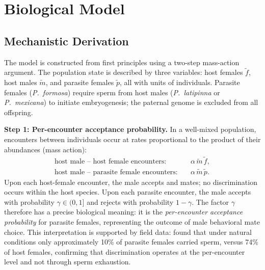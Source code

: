 \documentclass[12pt]{article}
\begin{document}
\section{Biological Model}

\subsection{Mechanistic Derivation}

The model is constructed from first principles using a two-step
mass-action argument. The population state is described by three
variables: host females $\tilde{f}$, host males $\tilde{m}$, and parasite
females $\tilde{p}$, all with units of individuals. Parasite females
(\textit{P.~formosa}) require sperm from host males (\textit{P.~latipinna}
or \textit{P.~mexicana}) to initiate embryogenesis; the paternal genome
is excluded from all offspring.

\noindent\textbf{Step 1: Per-encounter acceptance probability.}
In a well-mixed population, encounters between individuals occur at
rates proportional to the product of their abundances (mass action):
\begin{align*}
  \text{host male -- host female encounters:}   &\quad \alpha\,\tilde{m}\,\tilde{f}, \\
  \text{host male -- parasite female encounters:} &\quad \alpha\,\tilde{m}\,\tilde{p}.
\end{align*}
Upon each host-female encounter, the male accepts and mates; no
discrimination occurs within the host species.  Upon each parasite
encounter, the male accepts with probability $\gamma \in (0,1]$ and
rejects with probability $1-\gamma$.  The factor $\gamma$ therefore
has a precise biological meaning: it is the \emph{per-encounter
acceptance probability} for parasite females, representing the outcome
of male behavioral mate choice.  This interpretation is supported by
field data: \citet{Riesch2008} found that under natural conditions
only approximately 10\% of parasite females carried sperm, versus 74\%
of host females, confirming that discrimination operates at the
per-encounter level and not through sperm exhaustion.
\end{document}
